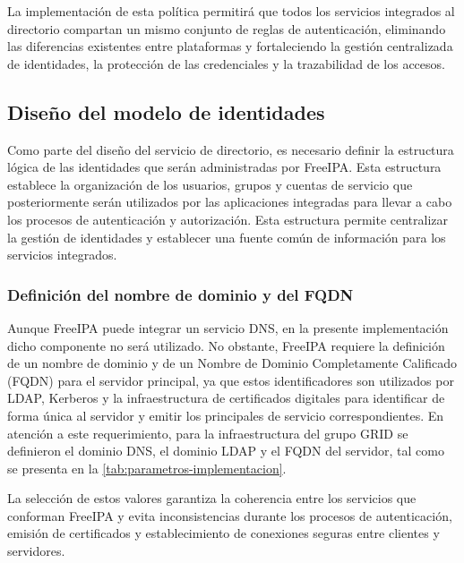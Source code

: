 La implementación de esta política permitirá que todos los servicios integrados al directorio compartan un mismo conjunto de reglas de autenticación, eliminando las diferencias existentes entre plataformas y fortaleciendo la gestión centralizada de identidades, la protección de las credenciales y la trazabilidad de los accesos.

\subsection{Diseño del modelo de identidades}

Como parte del diseño del servicio de directorio, es necesario definir la estructura lógica de las identidades que serán administradas por FreeIPA. Esta estructura establece la organización de los usuarios, grupos y cuentas de servicio que posteriormente serán utilizados por las aplicaciones integradas para llevar a cabo los procesos de autenticación y autorización. Esta estructura permite centralizar la gestión de identidades y establecer una fuente común de información para los servicios integrados.

\subsubsection{Definición del nombre de dominio y del \texorpdfstring{\acs{FQDN}}{FQDN}}

Aunque FreeIPA puede integrar un servicio \ac{DNS}, en la presente implementación dicho componente no será utilizado. No obstante, FreeIPA requiere la definición de un nombre de dominio y de un Nombre de Dominio Completamente Calificado (\ac{FQDN}) para el servidor principal, ya que estos identificadores son utilizados por \ac{LDAP}, Kerberos y la infraestructura de certificados digitales para identificar de forma única al servidor y emitir los principales de servicio correspondientes. En atención a este requerimiento, para la infraestructura del grupo \ac{GRID} se definieron el dominio \ac{DNS}, el dominio \ac{LDAP} y el \ac{FQDN} del servidor, tal como se presenta en la \autoref{tab:parametros-implementacion}.



La selección de estos valores garantiza la coherencia entre los servicios que conforman FreeIPA y evita inconsistencias durante los procesos de autenticación, emisión de certificados y establecimiento de conexiones seguras entre clientes y servidores.

